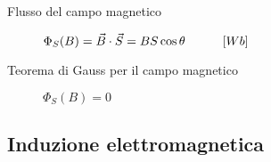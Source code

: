 \documentclass[a4paper,11pt,italian]{article}
\begin{document}
\begin{description}
  
  \item[Flusso del campo magnetico] 
  $ \Phi_S(B) = \vec{B} \cdot \vec{S} = B S \cos \theta \hspace*{3em} [Wb] $
  
  \item[Teorema di Gauss per il campo magnetico] 
  $ \Phi_S(B) = 0 $
  
%   
\end{description}

\subsection{Induzione elettromagnetica}
\end{document}
